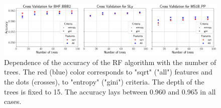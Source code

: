 \begin{figure}%
\includegraphics[width=\linewidth]{cross_val_RF}
\caption{Dependence of the accuracy of the RF algorithm with the number of trees. The red (blue) color corresponds to "sqrt" ("all") features and the dots (crosses), to "entropy" ("gini") criteria.  The depth of the trees is fixed to 15.  The accuracy lays between 0.960 and 0.965 in all cases.}
\label{fig:crossvalRF}
\end{figure}



